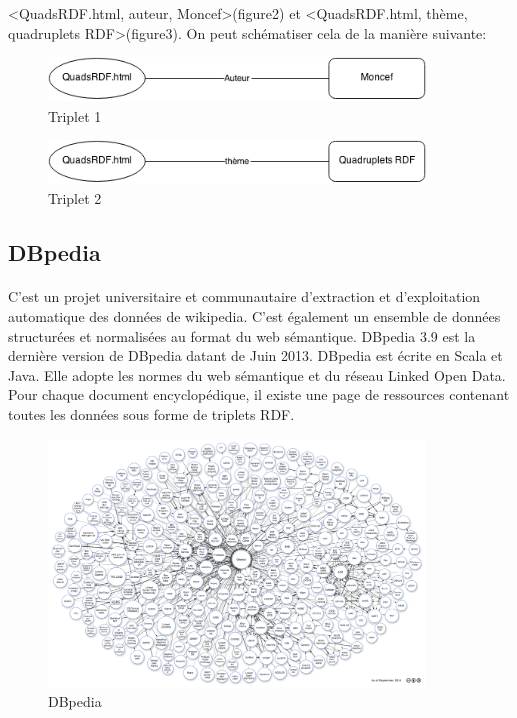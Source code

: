 <QuadsRDF.html, auteur, Moncef>(figure2) et <QuadsRDF.html, thème, quadruplets RDF>(figure3).
On peut schématiser cela de la manière suivante:
\begin{figure}[H]
        \centering
                \centering
                \includegraphics[width=10cm]{moncef.png}
               \caption{Triplet 1}

\end{figure}
\begin{figure}[H]
        \centering
                \centering
                \includegraphics[width=10cm]{quads.png}
               \caption{Triplet 2}

\end{figure}
\subsection*{DBpedia}
\paragraph{}
C'est un projet universitaire et communautaire d’extraction et d’exploitation automatique des données de wikipedia. C’est également un ensemble de données structurées et normalisées au format du web sémantique.
DBpedia 3.9 est la dernière version de DBpedia datant de Juin 2013. DBpedia est écrite en Scala et Java.
Elle adopte les normes du web sémantique et du réseau Linked Open Data. Pour chaque document encyclopédique, il existe une page de ressources contenant toutes les données sous forme de triplets RDF.
\begin{figure}[H]
        \centering
                \centering
                \includegraphics[width=10cm]{dbpedia.png}
               \caption{DBpedia}

\end{figure}
\newpage
